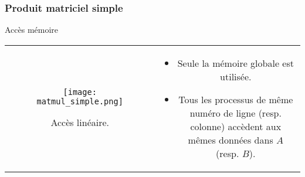 \begin{frame}
    \frametitle{Produit matriciel simple}
\begin{block}{Accès mémoire}
    \begin{tabular}{cc}
        \begin{minipage}{0.45\textwidth}
 \begin{figure}[htbp]
    \centering
   \texttt{[image: matmul\_simple.png]}
    \caption{Accès linéaire.}
    \label{fig:acces_matmul_simple}
\end{figure}
        \end{minipage} & 
        \begin{minipage}{0.45\textwidth}
            \begin{itemize}
                \item<+-> Seule la mémoire globale est utilisée.
                \item<+-> Tous les processus de même numéro de ligne (resp. colonne) accèdent aux mêmes données dans 
                $A$ (resp. $B$).
            \end{itemize}
        \end{minipage}
\end{tabular}
\end{block}
\end{frame}

